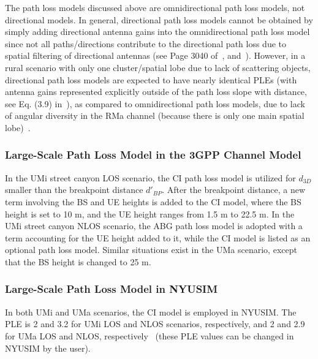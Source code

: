 \documentclass[journal]{IEEEtran}
\begin{document}
The path loss models discussed above are omnidirectional path loss models, not directional models. In general, directional path loss models cannot be obtained by simply adding directional antenna gains into the omnidirectional path loss model since not all paths/directions contribute to the directional path loss due to spatial filtering of directional antennas (see Page 3040 of~\cite{Rap15:TCOM}, and~\cite{Sun15_Syn,Mac14_Omni}). However, in a rural scenario with only one cluster/spatial lobe due to lack of scattering objects, directional path loss models are expected to have nearly identical PLEs (with antenna gains represented explicitly outside of the path loss slope with distance, see Eq. (3.9) in~\cite{Rap15}), as compared to omnidirectional path loss models, due to lack of angular diversity in the RMa channel (because there is only one main spatial lobe)~\cite{Mac17_RMa}.

\subsubsection{Large-Scale Path Loss Model in the 3GPP Channel Model~\cite{3GPP_Dec}}
In the UMi street canyon LOS scenario, the CI path loss model is utilized for $d_{3D}$ smaller than the breakpoint distance $d'_{BP}$. After the breakpoint distance, a new term involving the BS and UE heights is added to the CI model, where the BS height is set to 10 m, and the UE height ranges from 1.5 m to 22.5 m. In the UMi street canyon NLOS scenario, the ABG path loss model is adopted with a term accounting for the UE height added to it, while the CI model is listed as an optional path loss model. Similar situations exist in the UMa scenario, except that the BS height is changed to 25 m. 


\subsubsection{Large-Scale Path Loss Model in NYUSIM}
In both UMi and UMa scenarios, the CI model is employed in NYUSIM. The PLE is 2 and 3.2 for UMi LOS and NLOS scenarios, respectively, and 2 and 2.9 for UMa LOS and NLOS, respectively~\cite{Sun16:TVT,Sun17_NYUSIM} (these PLE values can be changed in NYUSIM by the user).
\end{document}
